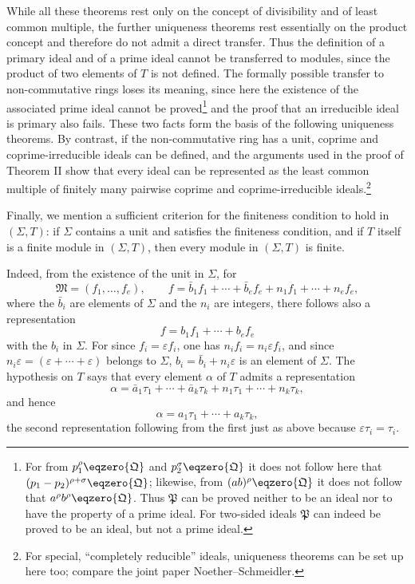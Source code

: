 \documentclass[11pt]{article}
\newcommand{\ideal}[1]{\mathfrak{#1}}
\begin{document}
While all these theorems rest only on the concept of divisibility and of least common multiple, the further uniqueness theorems rest essentially on the product concept and therefore do not admit a direct transfer. Thus the definition of a primary ideal and of a prime ideal cannot be transferred to modules, since the product of two elements of $T$ is not defined. The formally possible transfer to non-commutative rings loses its meaning, since here the existence of the associated prime ideal cannot be proved\footnote{For from $p_1^\rho\eqzero{\ideal Q}$ and $p_2^\sigma\eqzero{\ideal Q}$ it does not follow here that $(p_1-p_2)^{\rho+\sigma}\eqzero{\ideal Q}$; likewise, from $(ab)^\rho\eqzero{\ideal Q}$ it does not follow that $a^\rho b^\rho\eqzero{\ideal Q}$. Thus $\ideal P$ can be proved neither to be an ideal nor to have the property of a prime ideal. For two-sided ideals $\ideal P$ can indeed be proved to be an ideal, but not a prime ideal.} and the proof that an irreducible ideal is primary also fails. These two facts form the basis of the following uniqueness theorems. By contrast, if the non-commutative ring has a unit, coprime and coprime-irreducible ideals can be defined, and the arguments used in the proof of Theorem II show that every ideal can be represented as the least common multiple of finitely many pairwise coprime and coprime-irreducible ideals.\footnote{For special, ``completely reducible'' ideals, uniqueness theorems can be set up here too; compare the joint paper Noether--Schmeidler.}

Finally, we mention a sufficient criterion for the finiteness condition to hold in $(\Sigma,T)$: if $\Sigma$ contains a unit and satisfies the finiteness condition, and if $T$ itself is a finite module in $(\Sigma,T)$, then every module in $(\Sigma,T)$ is finite.

Indeed, from the existence of the unit in $\Sigma$, for
\[
 \ideal M=(f_1,
\ldots,f_e),
 \qquad
 f=\bar b_1f_1+\cdots+\bar b_ef_e+n_1f_1+\cdots+n_ef_e,
\]
where the $\bar b_i$ are elements of $\Sigma$ and the $n_i$ are integers, there follows also a representation
\[
 f=b_1f_1+\cdots+b_ef_e
\]
with the $b_i$ in $\Sigma$. For since $f_i=\varepsilon f_i$, one has $n_if_i=n_i\varepsilon f_i$, and since $n_i\varepsilon=(\varepsilon+\cdots+\varepsilon)$ belongs to $\Sigma$, $b_i=\bar b_i+n_i\varepsilon$ is an element of $\Sigma$. The hypothesis on $T$ says that every element $\alpha$ of $T$ admits a representation
\[
 \alpha=\bar a_1\tau_1+\cdots+\bar a_k\tau_k+n_1\tau_1+\cdots+n_k\tau_k,
\]
and hence
\[
 \alpha=a_1\tau_1+\cdots+a_k\tau_k,
\]
the second representation following from the first just as above because $\varepsilon\tau_i=\tau_i$.
\end{document}
